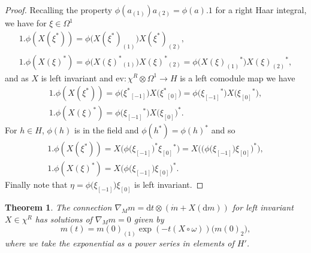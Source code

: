 \documentclass[10pt,a4paper]{amsart}
\numberwithin{equation}{section}
\newtheorem{Theorem}{Theorem}[section]
\newcommand{\ev}{\mathrm{ev}}
\newcommand{\extd}{\mathrm{d}}
\newcommand{\tens}{\mathop{\otimes}}
\newcommand{\<}{\langle}
\renewcommand{\>}{\rangle}
\begin{document}
\begin{proof}
	Recalling the property $ \phi (a_{(1)}) a_{(2)}=\phi (a).1$ for a right Haar integral, we have for $ \xi \in \Omega^{1} $
	\begin{gather*}
		1. \phi (X(\xi ^{*}))= \phi \big(X(\xi ^{*})_{(1)}\big) X(\xi ^{*})_{(2)},\\
			1. \phi (X(\xi )^{*})= \phi \big(X(\xi )^{*}{}_{(1)}\big) X(\xi )^{*}{}_{(2)}= \phi \big(X(\xi )_{(1)}{}^{*}\big) X(\xi )_{(2)}{}^{*},
	\end{gather*}
and as $ X $ is left invariant and $ \ev\colon \chi^{R} \tens \Omega^{1}\rightarrow H$ is a left comodule map we have
\begin{gather*}
	1. \phi (X(\xi ^{*}))= \phi \big(\xi ^{*}{}_{[-1]}\big) X\big(\xi ^{*}{}_{[0]}\big)	= \phi \big(\xi _{[-1]}{}^{*}\big) X\big(\xi _{[0]}{}^{*}\big),\\
		1. \phi (X(\xi )^{*})= \phi \big(\xi _{[-1]}{}^{*}\big) X\big(\xi _{[0]}\big)^{*}.
\end{gather*}
For $ h \in H $, $ \phi(h) $ is in the field and $ \phi(h^{*}) =\phi(h)^{*}$ and so
\begin{gather*}
	1. \phi (X(\xi ^{*}))= X\big(\phi \big(\xi _{[-1]}\big)^{*}\xi _{[0]}{}^{*}\big)= X\big(\big(\phi \big(\xi _{[-1]}\big)\xi _{[0]}\big)^{*}\big), \\
	1. \phi (X(\xi )^{*})= X\big(\phi \big(\xi _{[-1]}\big)\xi _{[0]}\big)^{*}.
\end{gather*}
Finally note that $ \eta=\phi\big(\xi_{[-1]}\big) \xi_{[0]}$ is left invariant.
\end{proof}

\begin{Theorem}\label{prp2tothm}
		The connection $ \nabla_{M} m= \extd t \tens (\dot{m}+X (\extd m )) $ for left invariant $ X\in \chi^{R} $ has solutions of $ \nabla_{M} m=0 $ given by
	\[m(t)=m(0)_{(1)} \exp(-t( X\circ \omega))\big(m(0)_{2}\big),\]
	where we take the exponential as a power series in elements of $H'$.
\end{Theorem}
\end{document}
